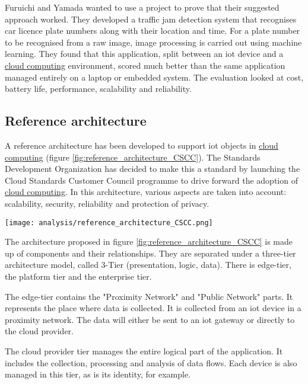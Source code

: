 Furuichi and Yamada wanted to use a project to prove that their suggested approach worked. They developed a traffic jam detection system that recognises car licence plate numbers along with their location and time. For a plate number to be recognised from a raw image, image processing is carried out using machine learning. They found that this application, split between an \acrshort{iot} device and a \hyperref[subsec:cloudcomputing]{cloud computing} environment, scored much better than the same application managed entirely on a laptop or embedded system. The evaluation looked at cost, battery life, performance, scalability and reliability. \cite{next_generation_iot_cloud}

\subsection{Reference architecture}
A reference architecture has been developed to support \acrshort{iot} objects in \hyperref[subsec:cloudcomputing]{cloud computing} (figure \ref{fig:reference_architecture_CSCC}). The Standards Development Organization has decided to make this a standard by launching the Cloud Standards Customer Council programme to drive forward the adoption of \hyperref[subsec:cloudcomputing]{cloud computing}. In this architecture, various aspects are taken into account: scalability, security, reliability and protection of privacy. \cite{reference_architecture_cloud_iot}
\begin{center}
    \begingroup
    \texttt{[image: analysis/reference\_architecture\_CSCC.png]}
    \label{fig:reference_architecture_CSCC}
    \endgroup
\end{center}
The architecture proposed in figure \ref{fig:reference_architecture_CSCC} is made up of components and their relationships. They are separated under a three-tier architecture model, called 3-Tier (presentation, logic, data). There is edge-tier, the platform tier and the enterprise tier.

The edge-tier contains the "Proximity Network" and "Public Network" parts. It represents the place where data is collected. It is collected from an \acrshort{iot} device in a proximity network. The data will either be sent to an \acrshort{iot} gateway or directly to the \gls{cloud} provider.

The \gls{cloud} provider tier manages the entire logical part of the application. It includes the collection, processing and analysis of data flows. Each device is also managed in this tier, as is its identity, for example.


